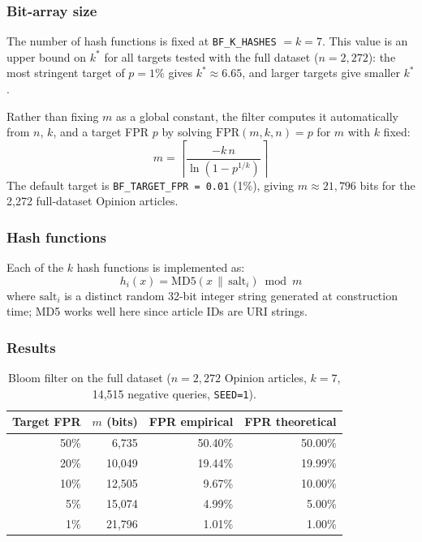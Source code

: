 \documentclass[11pt,a4paper]{article}
\begin{document}
\subsubsection*{Bit-array size}
The number of hash functions is fixed at \texttt{BF\_K\_HASHES} $= k = 7$.
This value is an upper bound on $k^*$ for all targets tested with the full dataset
($n = 2{,}272$): the most stringent target of $p = 1\%$ gives
$k^* \approx 6.65$, and larger targets give smaller $k^*$.

Rather than fixing $m$ as a global constant, the filter computes it automatically
from $n$, $k$, and a target FPR $p$ by solving $\mathrm{FPR}(m,k,n) = p$
for $m$ with $k$ fixed:
\[
  m = \left\lceil \frac{-k\, n}{\ln\!\left(1 - p^{1/k}\right)} \right\rceil
\]
The default target is \texttt{BF\_TARGET\_FPR = 0.01} (1\%), giving
$m \approx 21{,}796$ bits for the 2,272 full-dataset Opinion articles.

\subsubsection*{Hash functions}
Each of the $k$ hash functions is implemented as:
\[
  h_i(x) = \mathrm{MD5}(x \,\|\, \mathrm{salt}_i) \bmod m
\]
where $\mathrm{salt}_i$ is a distinct random 32-bit integer string generated at
construction time; MD5 works well here since article IDs are URI strings.

\subsubsection*{Results}

\begin{table}[H]
\centering
\begin{tabular}{rrrr}
\toprule
Target FPR & $m$ (bits) & FPR empirical & FPR theoretical \\
\midrule
50\% &  6,735 & 50.40\% & 50.00\% \\
20\% & 10,049 & 19.44\% & 19.99\% \\
10\% & 12,505 &  9.67\% & 10.00\% \\
 5\% & 15,074 &  4.99\% &  5.00\% \\
 1\% & 21,796 &  1.01\% &  1.00\% \\
\bottomrule
\end{tabular}
\caption{Bloom filter on the full dataset ($n=2{,}272$ Opinion articles, $k=7$,
  14,515 negative queries, \texttt{SEED=1}).}
\label{tab:bloom}
\end{table}
\end{document}
